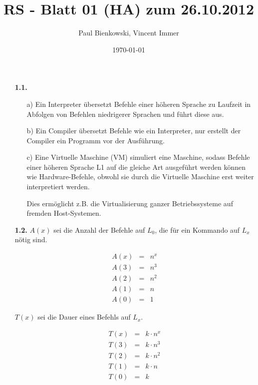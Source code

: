 \documentclass[10pt,a4paper]{article}
\author{Paul Bienkowski, Vincent Immer}
\title{RS - Blatt 01 (HA) zum 26.10.2012}
\date{\today}
\begin{document}
\setcounter{secnumdepth}{0}
\maketitle

\begin{enumerate}
    \item[\textbf{1.1.}]
        \begin{enumerate}
            \item[a)]
                Ein Interpreter übersetzt Befehle einer höheren Sprache zu Laufzeit in 
                Abfolgen von Befehlen niedrigerer Sprachen und führt diese aus.
            \item[b)]
                Ein Compiler übersetzt Befehle wie ein Interpreter, nur erstellt der 
                Compiler ein Programm vor der Ausführung.
            \item[c)]
                Eine Virtuelle Maschine (VM) simuliert eine Maschine, sodass Befehle einer
                höheren Sprache L1 auf die gleiche Art ausgeführt werden können wie Hardware-Befehle,
                obwohl sie durch die Virtuelle Maschine erst weiter interpretiert werden.
                
                Dies ermöglicht z.B. die Virtualisierung ganzer Betriebssysteme auf fremden Host-Systemen.
        \end{enumerate}
    \item[\textbf{1.2.}]
        $A(x)$ sei die Anzahl der Befehle auf $L_0$, die für ein Kommando auf $L_x$ nötig sind.
        
        $$\begin{array}{rcl}
            A(x) &=& n^x\\
            A(3) &=& n^3\\
            A(2) &=& n^2\\
            A(1) &=& n\\
            A(0) &=& 1
        \end{array}$$
        
        $T(x)$ sei die Dauer eines Befehls auf $L_x$.
    
        $$\begin{array}{rcl}
            T(x) &=& k \cdot n^x\\
            T(3) &=& k \cdot n^3\\
            T(2) &=& k \cdot n^2\\
            T(1) &=& k \cdot n\\
            T(0) &=& k
        \end{array}$$
    

\end{enumerate}
\end{document}
